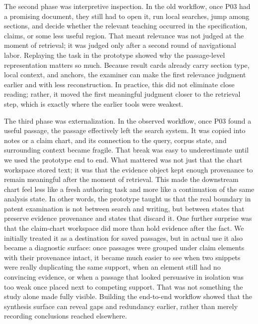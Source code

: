 \documentclass[sigconf]{acmart}
\begin{document}
The second phase was interpretive inspection. In the old workflow, once P03 had
a promising document, they still had to open it, run local searches, jump among
sections, and decide whether the relevant teaching occurred in the
specification, claims, or some less useful region. That meant relevance was not
judged at the moment of retrieval; it was judged only after a second round of
navigational labor. Replaying the task in the prototype showed why the
passage-level representation matters so much. Because result cards already carry
section type, local context, and anchors, the examiner can make the first
relevance judgment earlier and with less reconstruction. In practice, this did
not eliminate close reading; rather, it moved the first meaningful judgment
closer to the retrieval step, which is exactly where the earlier tools were
weakest.

The third phase was externalization. In the observed workflow, once P03 found a
useful passage, the passage effectively left the search system. It was copied
into notes or a claim chart, and its connection to the query, corpus state, and
surrounding context became fragile. That break was easy to underestimate until
we used the prototype end to end. What mattered was not just that the chart
workspace stored text; it was that the evidence object kept enough provenance to
remain meaningful after the moment of retrieval. This made the downstream chart
feel less like a fresh authoring task and more like a continuation of the same
analysis state. In other words, the prototype taught us that the real boundary
in patent examination is not between search and writing, but between states
that preserve evidence provenance and states that discard it. One further
surprise was that the claim-chart workspace did more than hold evidence after
the fact. We initially treated it as a destination for saved passages, but in
actual use it also became a diagnostic surface: once passages were grouped under
claim elements with their provenance intact, it became much easier to see when
two snippets were really duplicating the same support, when an element still had
no convincing evidence, or when a passage that looked persuasive in isolation
was too weak once placed next to competing support. That was not something the
study alone made fully visible. Building the end-to-end workflow showed that the
synthesis surface can reveal gaps and redundancy earlier, rather than merely
recording conclusions reached elsewhere.
\end{document}
